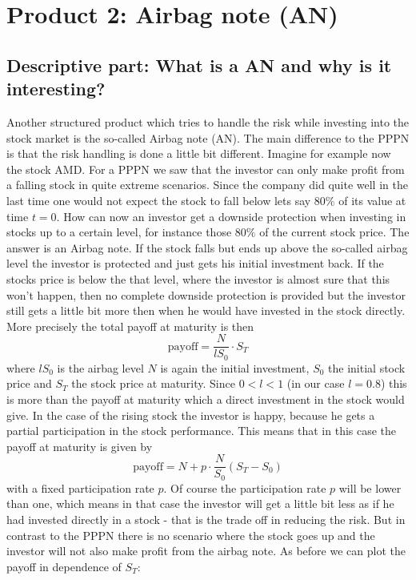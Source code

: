 \documentclass[11pt,oneside,a4paper]{article}
\begin{document}
	\section{Product 2: Airbag note (AN)}
	\subsection{Descriptive part: What is a AN and why is it interesting?}
	Another structured product which tries to handle the risk while investing into the stock market is the so-called Airbag note (AN). The main difference to the PPPN is that the risk handling is done a little bit different. Imagine for example now the stock AMD. 	For a PPPN we saw that the investor can only make profit from a falling stock in quite extreme scenarios.
	Since the company did quite well in the last time one would not expect the stock to fall below lets say $ 80 \% $ of its value at time $ t=0 $. How can now an investor get a downside protection when investing in stocks up to a certain level, for instance those $ 80\% $ of the current stock price. The answer is an Airbag note. If the stock falls but ends up above the so-called airbag level the investor is protected and just gets his initial investment back.
	If the stocks price is below the that level, where the investor is almost sure that this won't happen, then no complete downside protection is provided but the investor still gets a little bit more then when he would have invested in the stock directly. More precisely the total payoff at maturity is then 
	\[
		\text{payoff} = \frac{N}{l S_0}\cdot S_T
	\]
	 where $ l S_0 $ is the airbag level $ N $ is again the initial investment, $ S_0 $ the initial stock price and $ S_T $ the stock price at maturity. Since $ 0<l<1 $ (in our case $ l=0.8 $) this is more than the payoff at maturity which a direct investment in the stock would give.
	 In the case of the rising stock the investor is happy, because he gets a partial participation in the stock performance. This means that in this case the payoff at maturity is given by
	 \[
	 	\text{payoff} = N + p \cdot \frac{N}{S_0}(S_T - S_0)
	 \] 
	 with a fixed participation rate $ p $. Of course the participation rate $ p $ will be lower than one, which means in that case the investor will get a little bit less as if he had invested directly in a stock - that is the trade off in reducing the risk. But in contrast to the PPPN there is no scenario where the stock goes up and the investor will not also make profit from the airbag note.
	 As before we can plot the payoff in dependence of $ S_T $:
\end{document}

